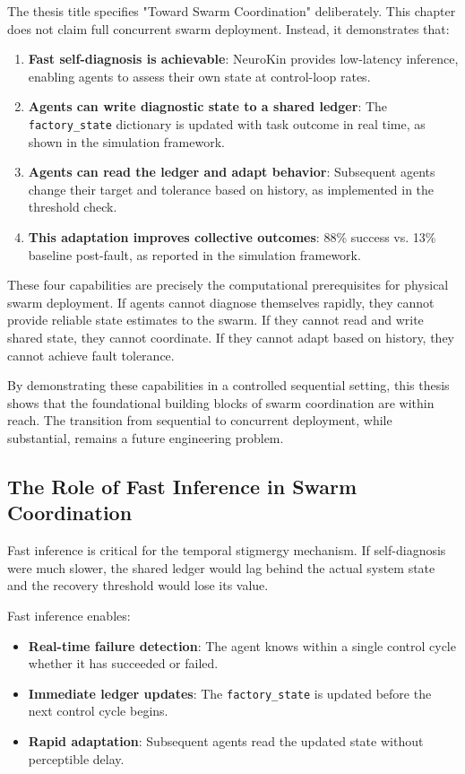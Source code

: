 \documentclass[12pt,a4paper,oneside]{report}
\begin{document}
The thesis title specifies "Toward Swarm Coordination" deliberately. This chapter does not claim full concurrent swarm deployment. Instead, it demonstrates that:

\begin{enumerate}
    \item \textbf{Fast self-diagnosis is achievable}: NeuroKin provides low-latency inference, enabling agents to assess their own state at control-loop rates.
    \item \textbf{Agents can write diagnostic state to a shared ledger}: The \texttt{factory\_state} dictionary is updated with task outcome in real time, as shown in the simulation framework.
    \item \textbf{Agents can read the ledger and adapt behavior}: Subsequent agents change their target and tolerance based on history, as implemented in the threshold check.
    \item \textbf{This adaptation improves collective outcomes}: 88\% success vs. 13\% baseline post-fault, as reported in the simulation framework.
\end{enumerate}

These four capabilities are precisely the computational prerequisites for physical swarm deployment. If agents cannot diagnose themselves rapidly, they cannot provide reliable state estimates to the swarm. If they cannot read and write shared state, they cannot coordinate. If they cannot adapt based on history, they cannot achieve fault tolerance.

By demonstrating these capabilities in a controlled sequential setting, this thesis shows that the foundational building blocks of swarm coordination are within reach. The transition from sequential to concurrent deployment, while substantial, remains a future engineering problem.

\subsection{The Role of Fast Inference in Swarm Coordination}
\label{subsec:the_role_of_fast_inference_in_swarm_coordination}

Fast inference is critical for the temporal stigmergy mechanism. If self-diagnosis were much slower, the shared ledger would lag behind the actual system state and the recovery threshold would lose its value.

Fast inference enables:
\begin{itemize}
    \item \textbf{Real-time failure detection}: The agent knows within a single control cycle whether it has succeeded or failed.
    \item \textbf{Immediate ledger updates}: The \texttt{factory\_state} is updated before the next control cycle begins.
    \item \textbf{Rapid adaptation}: Subsequent agents read the updated state without perceptible delay.
\end{itemize}
\end{document}
